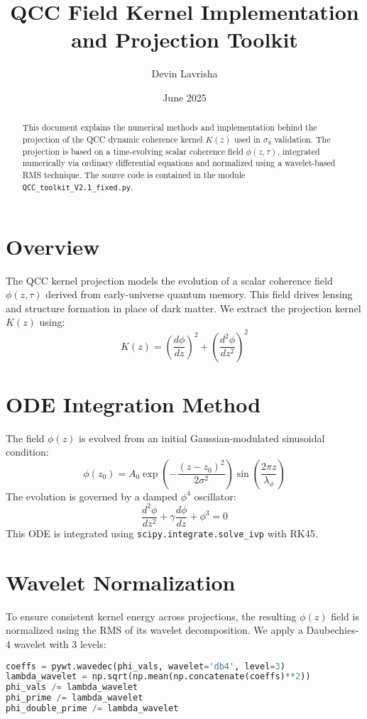 \documentclass[12pt]{article}
\title{QCC Field Kernel Implementation and Projection Toolkit}
\author{Devin Lavrisha}
\date{June 2025}
\begin{document}
\maketitle

\begin{abstract}
This document explains the numerical methods and implementation behind the projection of the QCC dynamic coherence kernel $K(z)$ used in $\sigma_8$ validation. The projection is based on a time-evolving scalar coherence field $\phi(z, \tau)$, integrated numerically via ordinary differential equations and normalized using a wavelet-based RMS technique. The source code is contained in the module \texttt{QCC\_toolkit\_V2.1\_fixed.py}.
\end{abstract}

\section{Overview}
The QCC kernel projection models the evolution of a scalar coherence field $\phi(z, \tau)$ derived from early-universe quantum memory. This field drives lensing and structure formation in place of dark matter. We extract the projection kernel $K(z)$ using:
\begin{equation}
K(z) = \left( \frac{d\phi}{dz} \right)^2 + \left( \frac{d^2\phi}{dz^2} \right)^2
\end{equation}

\section{ODE Integration Method}
The field $\phi(z)$ is evolved from an initial Gaussian-modulated sinusoidal condition:
\begin{equation}
\phi(z_0) = A_0 \exp\left( - \frac{(z - z_0)^2}{2 \sigma^2} \right) \sin\left( \frac{2\pi z}{\lambda_\phi} \right)
\end{equation}
The evolution is governed by a damped $\phi^4$ oscillator:
\begin{equation}
\frac{d^2\phi}{dz^2} + \gamma \frac{d\phi}{dz} + \phi^3 = 0
\end{equation}
This ODE is integrated using \texttt{scipy.integrate.solve\_ivp} with RK45.

\section{Wavelet Normalization}
To ensure consistent kernel energy across projections, the resulting $\phi(z)$ field is normalized using the RMS of its wavelet decomposition. We apply a Daubechies-4 wavelet with 3 levels:
\begin{lstlisting}[language=Python]
coeffs = pywt.wavedec(phi_vals, wavelet='db4', level=3)
lambda_wavelet = np.sqrt(np.mean(np.concatenate(coeffs)**2))
phi_vals /= lambda_wavelet
phi_prime /= lambda_wavelet
phi_double_prime /= lambda_wavelet
\end{lstlisting}
\end{document}
